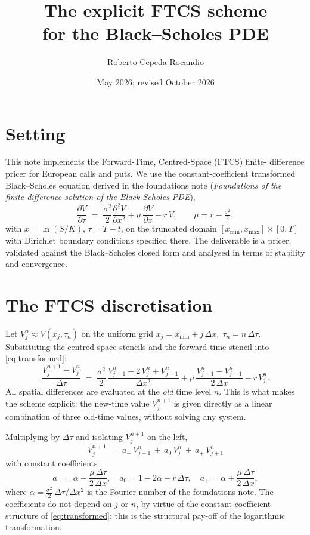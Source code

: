 \documentclass[11pt,a4paper]{article}
\title{The explicit FTCS scheme\\for the Black--Scholes PDE}
\author{Roberto Cepeda Rocandio}
\date{May 2026; revised October 2026}
\begin{document}
\maketitle

\section{Setting}

This note implements the Forward-Time, Centred-Space (FTCS) finite-
difference pricer for European calls and puts. We use the
constant-coefficient transformed Black--Scholes equation derived in
the foundations note (\emph{Foundations of the finite-difference
solution of the Black-Scholes PDE}),
\begin{equation}
\frac{\partial V}{\partial \tau}
\;=\; \frac{\sigma^2}{2}\frac{\partial^2 V}{\partial x^2}
   + \mu\,\frac{\partial V}{\partial x}
   - r\, V,
\qquad \mu = r - \tfrac{\sigma^2}{2},
\label{eq:transformed}
\end{equation}
with $x = \ln(S/K)$, $\tau = T - t$, on the truncated domain
$[x_{\min}, x_{\max}] \times [0, T]$ with Dirichlet boundary
conditions specified there. The deliverable is a pricer,
validated against the Black--Scholes closed form and analysed in
terms of stability and convergence.

\section{The FTCS discretisation}

Let $V_j^n \approx V(x_j, \tau_n)$ on the uniform grid $x_j = x_{\min}
+ j\,\Delta x,\;\tau_n = n\,\Delta\tau$. Substituting the centred space
stencils and the forward-time stencil into \eqref{eq:transformed}:
\[
\frac{V_j^{n+1} - V_j^n}{\Delta\tau}
\;=\; \frac{\sigma^2}{2}\,\frac{V_{j+1}^n - 2\,V_j^n + V_{j-1}^n}{\Delta x^2}
+ \mu\,\frac{V_{j+1}^n - V_{j-1}^n}{2\,\Delta x}
- r\,V_j^n.
\]
All spatial differences are evaluated at the \emph{old} time level $n$.
This is what makes the scheme explicit: the new-time value $V_j^{n+1}$
is given directly as a linear combination of three old-time values,
without solving any system.

Multiplying by $\Delta\tau$ and isolating $V_j^{n+1}$ on the left,
\begin{equation}
\boxed{\;\;
V_j^{n+1} \;=\; a_-\,V_{j-1}^n \,+\, a_0\,V_j^n \,+\, a_+\,V_{j+1}^n
\;\;}
\label{eq:ftcs}
\end{equation}
with constant coefficients
\begin{equation}
a_-  = \alpha - \frac{\mu\,\Delta\tau}{2\,\Delta x},\quad
a_0  = 1 - 2\alpha - r\,\Delta\tau,\quad
a_+  = \alpha + \frac{\mu\,\Delta\tau}{2\,\Delta x},
\label{eq:coeffs}
\end{equation}
where $\alpha = \frac{\sigma^2}{2}\,\Delta\tau / \Delta x^2$ is the
Fourier number of the foundations note. The coefficients do not depend on
$j$ or $n$, by virtue of the constant-coefficient structure of
\eqref{eq:transformed}: this is the structural pay-off of the
logarithmic transformation.
\end{document}
